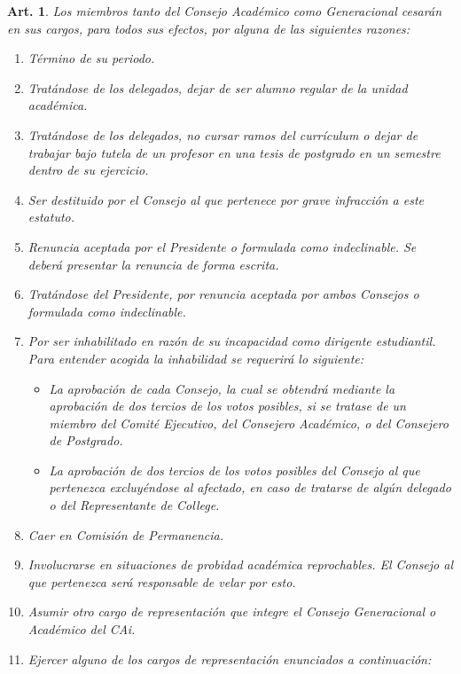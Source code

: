 \documentclass[letterpaper,11pt]{article}
\theoremstyle{plain}
\newtheorem{art}{Art.} %
\begin{document}
		\begin{art}\label{ceseCargo}
			Los miembros tanto del Consejo Académico como Generacional cesarán en sus cargos, para todos sus efectos, por alguna de las siguientes razones:
			\begin{enumerate}
				\item Término de su periodo.
				\item\label{alumno_regular} Tratándose de los delegados, dejar de ser alumno regular de la unidad académica.
				\item\label{sin_ramos} Tratándose de los delegados, no cursar ramos del currículum o dejar de trabajar bajo tutela de un profesor en una tesis de postgrado en un semestre dentro de su ejercicio.
				\item\label{destitucion} Ser destituido por el Consejo al que pertenece por grave infracción a este estatuto.
				\item\label{renuncia} Renuncia aceptada por el Presidente o formulada como indeclinable. Se deberá presentar la renuncia de forma escrita.
				\item Tratándose del Presidente, por renuncia aceptada por ambos Consejos o formulada como indeclinable.
				\item\label{inhabilitacion} Por ser inhabilitado en razón de su incapacidad como dirigente estudiantil. Para entender acogida la inhabilidad se requerirá lo siguiente:
					\begin{itemize}
						\item La aprobación de cada Consejo, la cual se obtendrá mediante la aprobación de dos tercios de los votos posibles, si se tratase de un miembro del Comité Ejecutivo, del Consejero Académico, o del Consejero de Postgrado.
						\item La aprobación de dos tercios de los votos posibles del Consejo al que pertenezca excluyéndose al afectado, en caso de tratarse de algún delegado o del Representante de College.
					\end{itemize}
				\item\label{permanencia} Caer en Comisión de Permanencia.
				\item Involucrarse en situaciones de probidad académica reprochables. El Consejo al que pertenezca será responsable de velar por esto.
				\item Asumir otro cargo de representación que integre el Consejo Generacional o Académico del CAi.
				\item Ejercer alguno de los cargos de representación enunciados a continuación:

\end{enumerate}
\end{art}
\end{document}
